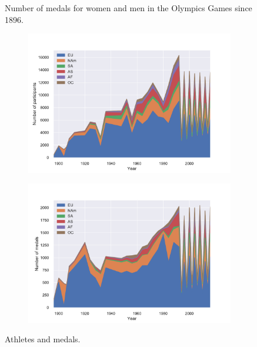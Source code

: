 \documentclass[11pt]{article} %
\begin{document}
\begin{figure}
\begin{subfigure}{0.5\textwidth}
    \end{subfigure}
    \caption{Number of medals for women and men in the Olympics Games since 1896.}
\end{figure}

\begin{figure}
    \centering
    \begin{subfigure}{0.5\textwidth}
    \hspace{-23mm}
    \includegraphics[scale=0.5]{Continent_area.pdf}
    \end{subfigure}%
    \begin{subfigure}{0.5\textwidth}
    \centering
    \includegraphics[scale=0.5]{Continent_area_medals.pdf}
    \end{subfigure} 
    \caption{Athletes and medals.}
\end{figure}
\end{document}
